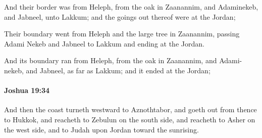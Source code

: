 			\begin{versebox}
					\item[BHS] 
					\item[ASV] And their border was from Heleph, from the oak in Zaanannim, and Adaminekeb, and Jabneel, unto Lakkum; and the goings out thereof were at the Jordan;
					\item[NIV] Their boundary went from Heleph and the large tree in Zaanannim, passing Adami Nekeb and Jabneel to Lakkum and ending at the Jordan.
					\item[NRSV] And its boundary ran from Heleph, from the oak in Zaanannim, and Adami-nekeb, and Jabneel, as far as Lakkum; and it ended at the Jordan;
			\end{versebox}

		\paragraph{Joshua 19:34} %
			\label{JOSHUA-19-34}

			And then the coast turneth westward to Aznothtabor, and goeth out from thence to Hukkok, and reacheth to Zebulun on the south side, and reacheth to Asher on the west side, and to Judah upon Jordan toward the sunrising.

